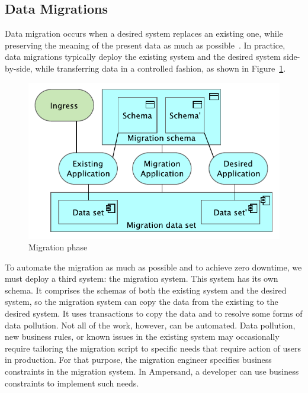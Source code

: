 \documentclass[runningheads]{llncs}
\begin{document}
\subsection{Data Migrations}
   Data migration occurs when a desired system replaces an existing one,
   while preserving the meaning of the present data as much as possible~\cite{Spivak2012}.
   In practice, data migrations typically deploy the existing system and the desired system side-by-side,
   while transferring data in a controlled fashion, as shown in Figure~\ref{fig:migration phase}.
\begin{figure}[bht]
   \begin{center}
     \includegraphics[scale=.8]{figures/migration_system_deployed.pdf}
   \end{center}
\caption{Migration phase}
\label{fig:migration phase}
\end{figure}
   To automate the migration as much as possible and to achieve zero downtime,
   we must deploy a third system: the migration system.
   This system has its own schema.
   It comprises the schemas of both the existing system and the desired system,
   so the migration system can copy the data from the existing to the desired system.
   It uses transactions to copy the data and to resolve some forms of data pollution.
   Not all of the work, however, can be automated.
   Data pollution, new business rules, or known issues in the existing system
   may occasionally require tailoring the migration script to specific needs
   that require action of users in production.
   For that purpose, the migration engineer specifies business constraints in the migration system.
   In Ampersand, a developer can use business constraints to implement such needs.
\end{document}
